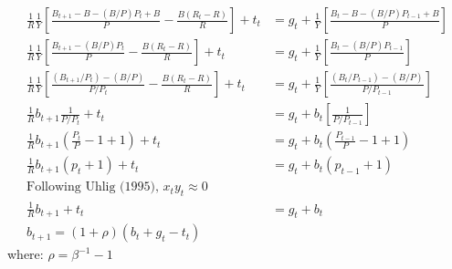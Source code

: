 \begin{align}
    \frac{1}{R}\frac{1}{Y}\left[\frac{B_{t+1}-B - (B/P)P_t + B}{P} - \frac{B(R_t-R)}{R}\right] + t_t &= g_t + \frac{1}{Y} \left[\frac{B_{t}-B - (B/P)P_{t-1} + B}{P}\right]\\
    \frac{1}{R}\frac{1}{Y}\left[\frac{B_{t+1} - (B/P)P_t}{P} - \frac{B(R_t-R)}{R}\right] + t_t &= g_t + \frac{1}{Y} \left[\frac{B_{t} - (B/P)P_{t-1}}{P}\right]\\
    \frac{1}{R}\frac{1}{Y}\left[\frac{(B_{t+1}/P_{t}) - (B/P)}{P / P_t} - \frac{B(R_t-R)}{R}\right] + t_t &= g_t + \frac{1}{Y} \left[\frac{(B_{t}/P_{t-1}) - (B/P)}{P/P_{t-1}}\right]\\
    \frac{1}{R} b_{t+1} \frac{1}{P / P_t} + t_t &= g_t + b_t \left[\frac{1}{P/P_{t-1}}\right]\\
    \frac{1}{R} b_{t+1} \left(\frac{P_t}{P} - 1 + 1\right) + t_t &= g_t + b_t \left(\frac{P_{t-1}}{P} - 1 + 1\right)\\
    \frac{1}{R} b_{t+1} \left(p_t + 1\right) + t_t &= g_t + b_t \left(p_{t-1} + 1\right)\\
    \text{Following Uhlig (1995), $x_t y_t \approx 0$}\nonumber \\
    \frac{1}{R} b_{t+1} + t_t &= g_t + b_t \\
    b_{t+1} = (1 + \rho)(b_t + g_t - t_t) \label{eq:appendix_log_budget_constraint_derivation_end}
\end{align}
where: $\rho = \beta^{-1} - 1$
\newpage